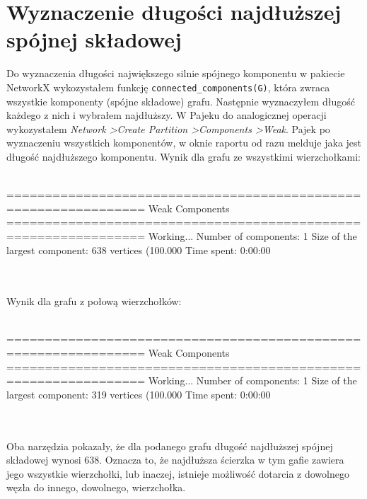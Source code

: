 \documentclass[a4paper,10pt]{article}
\begin{document}
	\section{Wyznaczenie długości najdłuższej spójnej składowej}
	Do wyznaczenia długości największego silnie spójnego komponentu w pakiecie NetworkX wykozystałem funkcję \texttt{connected\_components(G)}, która zwraca wszystkie komponenty (spójne składowe) grafu. Następnie wyznaczyłem długość każdego z nich i wybrałem najdłuższy. W Pajeku do analogicznej operacji wykozystałem \textit{Network \textgreater Create Partition \textgreater Components \textgreater Weak}. Pajek po wyznaczeniu wszystkich komponentów, w oknie raportu od razu melduje jaka jest długość najdłuższego komponentu. Wynik dla grafu ze wszystkimi wierzchołkami:\\\\
	\begin{verbbox}
		================================================================
		Weak Components
		================================================================
		 Working...
		 Number of components: 1
		 Size of the largest component: 638 vertices (100.000%
		 Time spent:  0:00:00
	\end{verbbox}
	\fbox{\theverbbox}
	\\\\
	Wynik dla grafu z połową wierzchołków:\\\\
	\begin{verbbox}
		================================================================
		Weak Components
		================================================================
		 Working...
		 Number of components: 1
		 Size of the largest component: 319 vertices (100.000%
		 Time spent:  0:00:00
	\end{verbbox}
	\fbox{\theverbbox}
	\\\\
	Oba narzędzia pokazały, że dla podanego grafu długość najdłuższej spójnej składowej wynosi 638. Oznacza to, że najdłuższa ścierzka w tym gafie zawiera jego wszystkie wierzchołki, lub inaczej, istnieje możliwość dotarcia z dowolnego węzła do innego, dowolnego, wierzchołka.
\end{document}
